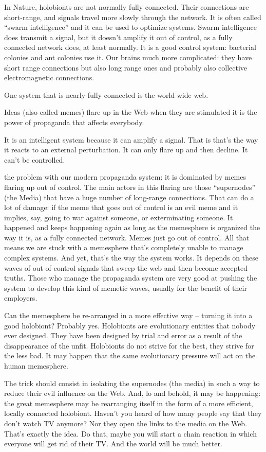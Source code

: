 \documentclass[
]{book}
\begin{document}
In Nature, holobionts are not normally fully connected. Their connections are short-range, and signals travel more slowly through the network. It is often called ``swarm intelligence'' and it can be used to optimize systems. Swarm intelligence does transmit a signal, but it doesn't amplify it out of control, as a fully connected network does, at least normally. It is a good control system: bacterial colonies and ant colonies use it. Our brains much more complicated: they have short range connections but also long range ones and probably also collective electromagnetic connections.

One system that is nearly fully connected is the world wide web.

Ideas (also called memes) flare up in the Web when they are stimulated it is the power of propaganda that affects everybody.

It is an intelligent system because it can amplify a signal. That is that's the way it reacts to an external perturbation.
It can only flare up and then decline. It can't be controlled.

the problem with our modern propaganda system: it is dominated by memes flaring up out of control. The main actors in this flaring are those ``supernodes'' (the Media) that have a huge number of long-range connections. That can do a lot of damage: if the meme that goes out of control is an evil meme and it implies, say, going to war against someone, or exterminating someone. It happened and keeps happening again as long as the memesphere is organized the way it is, as a fully connected network. Memes just go out of control.
All that means we are stuck with a memesphere that's completely unable to manage complex systems. And yet, that's the way the system works. It depends on these waves of out-of-control signals that sweep the web and then become accepted truths. Those who manage the propaganda system are very good at pushing the system to develop this kind of memetic waves, usually for the benefit of their employers.

Can the memesphere be re-arranged in a more effective way -- turning it into a good holobiont? Probably yes. Holobionts are evolutionary entities that nobody ever designed. They have been designed by trial and error as a result of the disappearance of the unfit. Holobionts do not strive for the best, they strive for the less bad. It may happen that the same evolutionary pressure will act on the human memesphere.

The trick should consist in isolating the supernodes (the media) in such a way to reduce their evil influence on the Web. And, lo and behold, it may be happening: the great memesphere may be rearranging itself in the form of a more efficient, locally connected holobiont. Haven't you heard of how many people say that they don't watch TV anymore? Nor they open the links to the media on the Web. That's exactly the idea. Do that, maybe you will start a chain reaction in which everyone will get rid of their TV. And the world will be much better.
\end{document}
